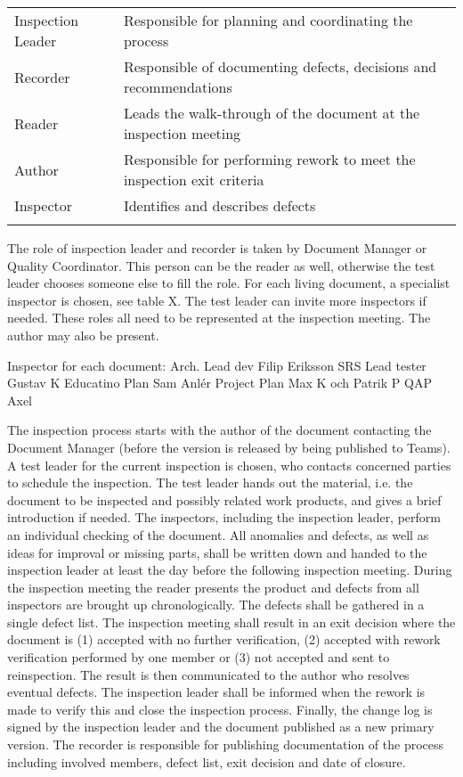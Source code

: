 \documentclass{article}
\begin{document}
	\smallskip
	\begin{table}[h]
		\begin{tabularx}{\textwidth}{lX}
			Inspection Leader & Responsible for planning and coordinating the process \\
			Recorder & Responsible of documenting defects, decisions and recommendations \\
			Reader & Leads the walk-through of the document at the inspection meeting \\
			Author & Responsible for performing rework to meet the inspection exit criteria \\
			Inspector & Identifies and describes defects \\
			&  \\
		\end{tabularx}
	\end{table}
	
	
	The role of inspection leader and recorder is taken by Document Manager or Quality Coordinator. This person can be the reader as well, otherwise the test leader chooses someone else to fill the role. For each living document, a specialist inspector is chosen, see table X. The test leader can invite more inspectors if needed. These roles all need to be represented at the inspection meeting. The author may also be present.
	
	Inspector for each document:
	Arch. Lead dev Filip Eriksson
	SRS  Lead tester Gustav K
	Educatino Plan Sam Anlér
	Project Plan Max K och Patrik P
	QAP Axel
	
	
	The inspection process starts with the author of the document contacting the Document Manager (before the version is released by being published to Teams). A test leader for the current inspection is chosen, who contacts concerned parties to schedule the inspection. The test leader hands out the material, i.e. the document to be inspected and possibly related work products, and gives a brief introduction if needed. The inspectors, including the inspection leader, perform an individual checking of the document. All anomalies and defects, as well as ideas for improval or missing parts, shall be written down and handed to the inspection leader at least the day before the following inspection meeting. During the inspection meeting the reader presents the product and defects from all inspectors are  brought up chronologically. The defects shall be gathered in a single defect list. The inspection meeting shall result in an exit decision where the document is (1) accepted with no further verification, (2) accepted with rework verification performed by one member or (3) not accepted and sent to reinspection. The result is then communicated to the author who resolves eventual defects. The inspection leader shall be informed when the rework is made to verify this and close the inspection process. Finally, the change log is signed by the inspection leader and the document published as a new primary version. The recorder is responsible for publishing documentation of the process including involved members, defect list, exit decision and date of closure.
	
\end{document}
